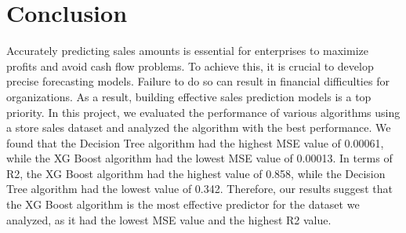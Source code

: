 %
%

\chapter{Conclusion}


Accurately predicting sales amounts is essential for enterprises to maximize profits and avoid cash flow problems. To achieve this, it is crucial to develop precise forecasting models. Failure to do so can result in financial difficulties for organizations. As a result, building effective sales prediction models is a top priority. In this project, we evaluated the performance of various algorithms using a store sales dataset and analyzed the algorithm with the best performance. We found that the Decision Tree algorithm had the highest MSE value of 0.00061, while the XG Boost algorithm had the lowest MSE value of 0.00013. In terms of R2, the XG Boost algorithm had the highest value of 0.858, while the Decision Tree algorithm had the lowest value of 0.342. Therefore, our results suggest that the XG Boost algorithm is the most effective predictor for the dataset we analyzed, as it had the lowest MSE value and the highest R2 value.